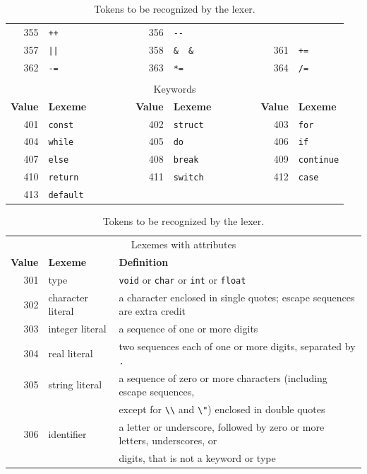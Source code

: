 \documentclass{report}
\newcommand{\+}{}
\begin{document}
\begin{table}[t]
\begin{tabular}{rlcrlcrl}
            355 & \verb|++| & &
            356 & \verb|--| \\
            357 & \verb+||+ & &
            358 & \verb|&  &  | & &
            361 & \verb|+=| \\
            362 & \verb|-=| & &
            363 & \verb|*=| & &
            364 & \verb|/=| \\
            \\
            \multicolumn{8}{c}{Keywords}
            \\[1mm]
            {\bf Value} & {\bf Lexeme}
            & ~~~~~~ &
                {\bf Value} & {\bf Lexeme}
            & ~~~~~~ &
                {\bf Value} & {\bf Lexeme}
            \\ \cline{1-2} \cline{4-5} \cline{7-8}
            401 & \verb|const| & &
            402 & \verb|struct| & &
            403 & \verb|for| \\
            404 & \verb|while| & &
            405 & \verb|do| & &
            406 & \verb|if| \\
            407 & \verb|else| & &
            408 & \verb|break| & &
            409 & \verb|continue| \\
            410 & \verb|return| & &
            411 & \verb|switch| & &
            412 & \verb|case| \\
            413 & \verb|default| \\
        \end{tabular}

        \begin{tabular}{rll}
            \\
            \multicolumn{3}{c}{Lexemes with attributes}
            \\[1mm]
            {\bf Value} & {\bf Lexeme} & {\bf Definition}
            \\ \hline
            301 & type & \verb|void| or \verb|char| or \verb|int| or \verb|float|
            \\
            302 & character literal & a character enclosed in single quotes;
            escape sequences are extra credit
            \\
            303 & integer literal & a sequence of one or more digits
            \\
            304 & real literal & two sequences each of one or more digits, separated by \verb|.|
            \\
            305 & string literal & a sequence of zero or more characters (including escape sequences,
            \\ & & except for \verb|\\| and \verb|\"|) enclosed in double quotes
            \\
            306 & identifier & a letter or underscore, followed by zero or more letters,
            underscores, or
            \\ & & digits, that is not a keyword or type
        \end{tabular}

        \caption{Tokens to be recognized by the lexer.}
        \label{tab:tokens}
    \end{table}
\end{document}

